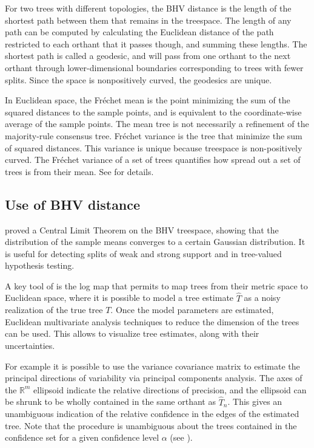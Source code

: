 For two trees with different topologies, the BHV distance is the length of the shortest path between them that remains in the treespace.  The length of any path can be computed by calculating the Euclidean distance of the path restricted to each orthant that it passes though, and summing these lengths.  The shortest path is called a geodesic, and will pass from one orthant to the next orthant through lower-dimensional boundaries
corresponding to trees with fewer splits. Since the space is nonpositively  curved, the  geodesics are unique. 

In Euclidean space, the Fr\'echet mean is the point minimizing the sum of the squared distances to the sample points, and is equivalent to the coordinate-wise average of the sample points. The mean tree is not necessarily a refinement of the majority-rule consensus tree. Fr\'echet variance is the tree that minimize the sum of squared distances.  This variance is unique because treespace is non-positively curved. The Fr\'echet variance of a set of trees quantifies how spread out a set of trees is from their mean. See \cite{miller2015polyhedral,brown2017mean} for details.

\subsection{Use of BHV distance} \label{sec:means-and-variance}

\cite{barden2017logarithm} proved a Central Limit Theorem on the BHV treespace, showing that the distribution of the sample means converges to a certain Gaussian distribution. It is useful for detecting splits of weak and strong support and in tree-valued hypothesis testing.

A key tool of \cite{barden2014limiting}is  the log map  that permits to  map  trees  from  their  metric  space  to  Euclidean space, where it is possible to model a tree estimate $\hat T$ as a noisy realization of the true tree $T$. Once  the model parameters are estimated, Euclidean multivariate analysis techniques to reduce the dimension of the trees can be used. This allows to visualize tree estimates, along with their uncertainties.

For example it is possible to use the variance covariance matrix to  estimate  the  principal  directions  of  variability  via principal components analysis. The axes of the $\mathbb{R}^m$ ellipsoid indicate the relative directions of precision, and the ellipsoid can be shrunk  to be wholly contained in the same orthant as $\hat T_n$. This gives an unambiguous indication of the relative
confidence in the edges of the estimated tree. Note that the procedure is unambiguous about the trees contained in the confidence set for a given confidence level $\alpha$ (see \cite{willis2016confidence}).

